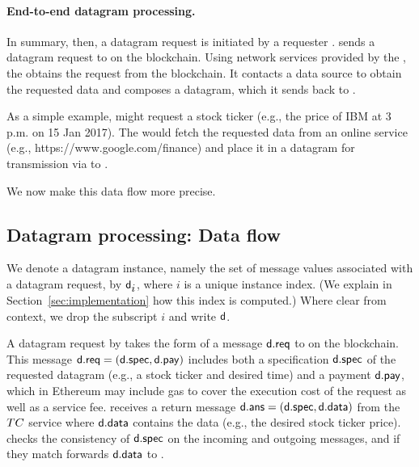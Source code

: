 \paragraph{End-to-end datagram processing.}
In summary, then, a datagram request is initiated by a requester \reqcont. \reqcont sends a datagram request to \tcont on the blockchain. Using network services provided by the \medname, the \encname obtains the request from the blockchain. It contacts a data source to obtain the requested data and composes a datagram, which it sends back to \reqcont.

As a simple example, \reqcont might request a stock ticker  (e.g., the price of IBM at 3 p.m. on 15 Jan 2017). The \encname would fetch the requested data from an online service (e.g., https://www.google.com/finance) and place it in a datagram for transmission via \tcont to \reqcont.


We now make this data flow more precise. 

\subsection{Datagram processing: Data flow}

We denote a datagram instance, namely the set of message values associated with a datagram request, by ${\sf d_{\mbox{$i$}}}$, where $i$ is a unique instance index. (We explain in Section~\ref{sec:implementation} how this index is computed.) Where clear from context, we drop the subscript $i$ and write ${\sf d}$.

A datagram request by \reqcont takes the form of a message ${\sf d.req}$ to \tcont on the blockchain. This message ${\sf d.req} = ({\sf d.spec}, {\sf d.pay})$ includes both a specification ${\sf d.spec}$ of the requested datagram (e.g., a stock ticker and desired time) and a payment ${\sf d.pay}$, which in Ethereum may include gas to cover the execution cost of the request as well as a service fee. \tcont receives a return message ${\sf d.ans} = ({\sf d.spec}, {\sf d.data})$ from the $TC$ service where ${\sf d.data}$ contains the data (e.g., the desired stock ticker price). \tcont checks the consistency of ${\sf d.spec}$ on the incoming and outgoing messages, and if they match forwards ${\sf d.data}$ to \reqcont. 

